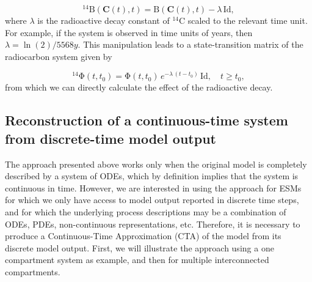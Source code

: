 \documentclass[11pt,a4paper]{article}
\renewcommand{\vec}[1]{\mathbf{#1}}
\newcommand{\tens}[1]{\mathrm{#1}}
\newcommand{\id}{\tens{Id}}
\begin{document}
    \begin{equation*}
        {}^{14}\tens{B}(\vec{C}(t),t) = \tens{B}(\vec{C}(t),t) - \lambda\,\id,
    \end{equation*}
    where $\lambda$ is the radioactive decay constant of ${}^{14}$C scaled to the relevant time unit.
    For example, if the system is observed in time units of years, then $\lambda=\ln(2)/5568 y$.
    This manipulation leads to a state-transition matrix of the radiocarbon system given by
    
    \begin{equation*}
        {}^{14}\tens{\Phi}(t,t_0) = \tens{\Phi}(t,t_0)\, e^{-\lambda\,(t-t_0)}\,\id, \quad t\geq t_0,
    \end{equation*}
    from which we can directly calculate the effect of the radioactive decay.


\subsection{Reconstruction of a continuous-time system from discrete-time model output}
The approach presented above works only when the original model is completely described by a system of ODEs, which by definition implies that the system is continuous in time. However, we are interested in using the approach for ESMs for which we only have access to model output reported in discrete time steps, and for which the underlying process descriptions may be a combination of ODEs, PDEs, non-continuous representations, etc. Therefore, it is necessary to prroduce a Continuous-Time Approximation (CTA) of the model from its discrete model output. First, we will illustrate the approach using a one compartment system as example, and then for multiple interconnected compartments. 
    
\end{document}
